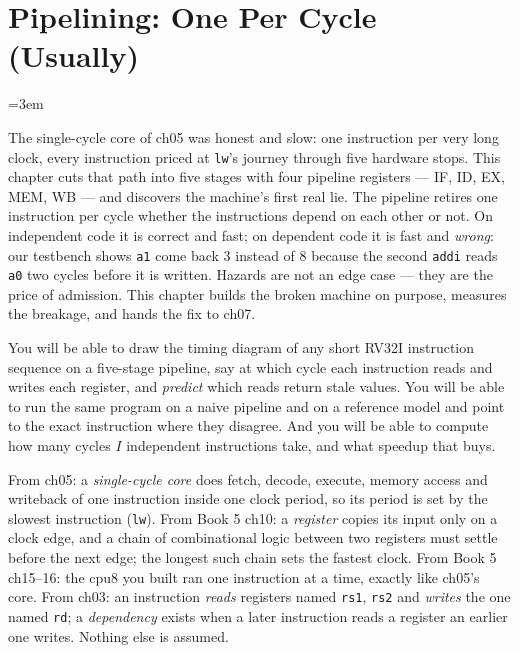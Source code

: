 \chapter{Pipelining: One Per Cycle (Usually)}
\label{ch:pipe06}
\emergencystretch=3em

The single-cycle core of ch05 was honest and slow: one instruction
per very long clock, every instruction priced at \texttt{lw}'s
journey through five hardware stops. This chapter cuts that path
into five stages with four pipeline registers --- IF, ID, EX, MEM,
WB --- and discovers the machine's first real lie. The pipeline
retires one instruction per cycle whether the instructions depend
on each other or not. On independent code it is correct and fast;
on dependent code it is fast and \emph{wrong}: our testbench shows
\texttt{a1} come back 3 instead of 8 because the second
\texttt{addi} reads \texttt{a0} two cycles before it is written.
Hazards are not an edge case --- they are the price of admission.
This chapter builds the broken machine on purpose, measures the
breakage, and hands the fix to ch07.
\begin{wins}
You will be able to draw the timing diagram of any short RV32I
instruction sequence on a five-stage pipeline, say at which cycle each
instruction reads and writes each register, and \emph{predict} which
reads return stale values. You will be able to run the same program on
a naive pipeline and on a reference model and point to the exact
instruction where they disagree. And you will be able to compute how
many cycles $I$ independent instructions take, and what speedup that
buys.
\end{wins}

\begin{rulebox}
From ch05: a \emph{single-cycle core} does fetch, decode, execute,
memory access and writeback of one instruction inside one clock
period, so its period is set by the slowest instruction (\texttt{lw}).
From Book 5 ch10: a \emph{register} copies its input only on a clock
edge, and a chain of combinational logic between two registers must
settle before the next edge; the longest such chain sets the fastest
clock. From Book 5 ch15--16: the cpu8 you built ran one instruction
at a time, exactly like ch05's core. From ch03: an instruction \emph{reads}
registers named \texttt{rs1}, \texttt{rs2} and \emph{writes} the one
named \texttt{rd}; a \emph{dependency} exists when a later instruction
reads a register an earlier one writes. Nothing else is assumed.
\end{rulebox}

